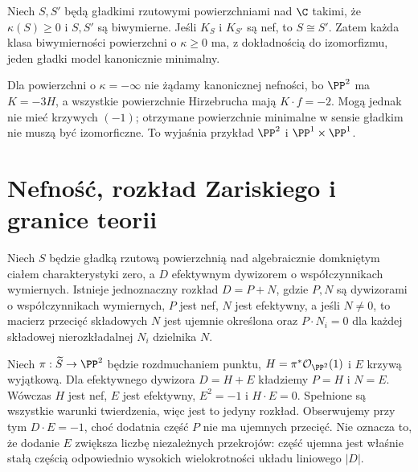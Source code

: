 \begin{twierdzenie}
\label{tw:ga8-minimal-unique}
Niech $S,S'$ będą gładkimi rzutowymi powierzchniami
nad $\C$ takimi, że $\kappa(S)\ge0$ i $S,S'$
są biwymierne. Jeśli $K_S$ i $K_{S'}$ są nef,
to $S\cong S'$. Zatem każda klasa biwymierności
powierzchni o $\kappa\ge0$ ma, z dokładnością do
izomorfizmu, jeden gładki model kanonicznie minimalny.
\end{twierdzenie}
\begin{uwaga}
Dla powierzchni o $\kappa=-\infty$ nie żądamy
kanonicznej nefności, bo $\PP^2$ ma $K=-3H$,
a wszystkie powierzchnie Hirzebrucha mają
$K\cdot f=-2$. Mogą jednak nie mieć krzywych
$(-1)$; otrzymane powierzchnie minimalne w sensie gładkim
nie muszą być izomorficzne. To wyjaśnia przykład
$\PP^2$ i $\PP^1\times\PP^1$.
\end{uwaga}

\section{Nefność, rozkład Zariskiego i granice teorii}
\label{sec:ga8-zariski-decomposition}

\begin{twierdzenie}
\label{tw:ga8-zariski-decomposition}
Niech $S$ będzie gładką rzutową powierzchnią nad
algebraicznie domkniętym ciałem charakterystyki zero,
a $D$ efektywnym dywizorem o współczynnikach wymiernych.
Istnieje jednoznaczny rozkład $D=P+N$, gdzie
$P,N$ są dywizorami o współczynnikach wymiernych,
$P$ jest nef, $N$ jest efektywny, a jeśli $N\ne0$,
to macierz przecięć składowych $N$ jest ujemnie
określona oraz $P\cdot N_i=0$ dla każdej składowej
nierozkładalnej $N_i$ dzielnika $N$.
\end{twierdzenie}

\begin{przyklad}
Niech $\pi:\widetilde S\to\PP^2$ będzie rozdmuchaniem
punktu, $H=\pi^*\mathcal O_{\PP^2}(1)$ i $E$
krzywą wyjątkową. Dla efektywnego dywizora
$D=H+E$ kładziemy $P=H$ i $N=E$.
Wówczas $H$ jest nef, $E$ jest efektywny,
$E^2=-1$ i $H\cdot E=0$. Spełnione są wszystkie
warunki twierdzenia, więc jest to jedyny rozkład.
Obserwujemy przy tym $D\cdot E=-1$,
choć dodatnia część $P$ nie ma ujemnych przecięć.
Nie oznacza to, że dodanie $E$ zwiększa liczbę
niezależnych przekrojów: część ujemna jest
właśnie stałą częścią odpowiednio wysokich
wielokrotności układu liniowego $|D|$.
\end{przyklad}

